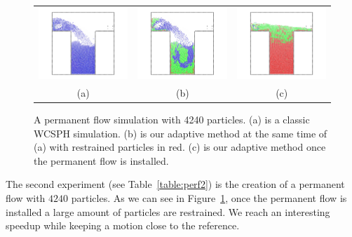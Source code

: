 \documentclass[11pt, oneside, a4paper]{memoir}
\begin{document}
\begin{figure}[!ht]
    \centering
    \begin{tabular}{ccc}
        \includegraphics[width=.32\linewidth]{images/arps-vriphys2013/PermanentFlowSPH.jpg} &
        \includegraphics[width=.32\linewidth]{images/arps-vriphys2013/PermanentFlowARPSColor.jpg} &
  \includegraphics[width=.32\linewidth]{images/arps-vriphys2013/PermanentFlowARPSColor2.jpg} \\
  (a) & (b) & (c)
    \end{tabular}
    \caption{\label{fig:permanentflow} A permanent flow simulation with 4240 particles.
    (a) is a classic WCSPH simulation. (b) is our adaptive method at the same time of (a) with restrained particles in red. (c) is our adaptive method once the permanent flow is installed.}
\end{figure}
\newline
The second experiment (see Table~\ref{table:perf2}) is the creation of a permanent flow with $4240$ particles. As we can see in Figure~\ref{fig:permanentflow}, once the permanent flow is installed a large amount of particles are restrained. We reach an interesting speedup while keeping a motion close to the reference.
\end{document}
